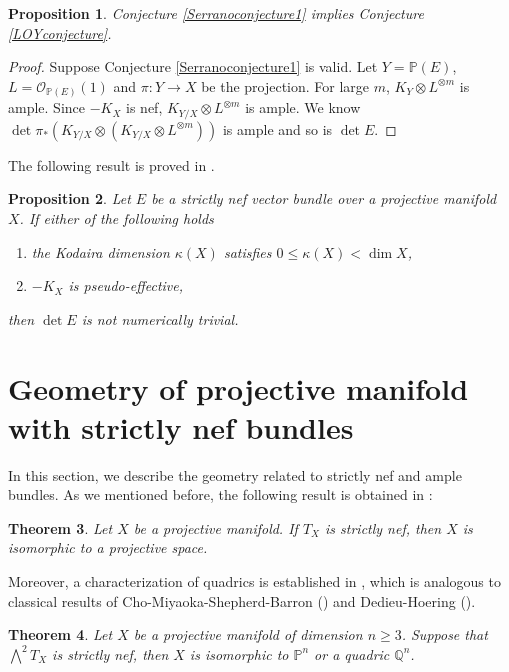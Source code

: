 \documentclass[english,reqno]{amsart}
\newcommand\bbP{{\mathbb P}}
\newcommand\sO{{\mathscr O}}
\theoremstyle{plain}
\newtheorem{thm}{Theorem}[section]
\newtheorem{prop}[thm]{Proposition}
\theoremstyle{definition}
\numberwithin{equation}{section} %
\begin{document}
\begin{prop}\label{SerranoconjectureimpliesLOYconjecture} Conjecture \ref{Serranoconjecture1} implies Conjecture \ref{LOYconjecture}.
\end{prop}
\begin{proof} Suppose  Conjecture \ref{Serranoconjecture1} is valid. Let $Y=\bbP(E)$, $L=\sO_{\bbP(E)}(1)$ and $\pi:Y\rightarrow X$ be the projection. For large $m$, $K_Y\otimes L^{\otimes m}$ is ample. Since $-K_X$ is nef,  $K_{Y/X}\otimes L^{\otimes m}$ is ample. We know $\det \pi_*\left(K_{Y/X}\otimes\left(K_{Y/X}\otimes L^{\otimes m}\right)\right)$ is  ample and so is $\det E$.
\end{proof}



 The following result is proved in \cite[Section~3]{LiOuYang2019}.
\begin{prop}\label{flat} Let $E$  be a strictly nef vector bundle
    over a projective manifold $X$. If either of the following holds
    \begin{enumerate}
        \item the Kodaira dimension $\kappa (X)$ satisfies $0 \leqslant \kappa (X)<\dim X$,

        \item $-K_X$ is pseudo-effective,
    \end{enumerate}  then  $\det E$ is not numerically trivial.
\end{prop}






\baselineskip




\section{Geometry of projective manifold with strictly nef bundles}

In this section, we describe the geometry related to strictly nef  and ample bundles.  As we mentioned before,     the following result is obtained  in \cite[Theorem~1.3]{LiOuYang2019}:
\begin{thm} Let $X$ be a projective manifold. If $T_X$ is strictly nef, then $X$ is isomorphic to a projective space.
    \end{thm}



\noindent Moreover,
a characterization of quadrics is  established in \cite[Theorem~1.5]{LiOuYang2019}, which is analogous to classical results   of  Cho-Miyaoka-Shepherd-Barron (\cite{ChoMiyaokaShepherd-Barron2002}) and Dedieu-Hoering (\cite{DedieuHoering2017}).
\begin{thm}
    Let $X$ be a  projective manifold of
    dimension $n\geq 3$. Suppose that $\bigwedge^2T_X$ is strictly nef,
    then $X$ is isomorphic to $\mathbb P^n$ or a quadric $\mathbb Q^n$.
\end{thm}
\end{document}

